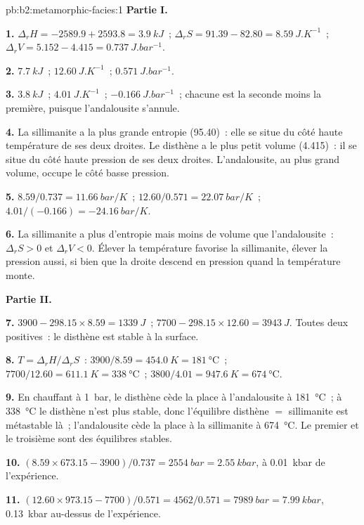 \begin{solution}{pb:b2:metamorphic-facies:1}
\noindent\textbf{Partie I.}

\textbf{1.} $\Delta_r H = -2589.9 + 2593.8 = \qty{3.9}{kJ}$~; $\Delta_r S = 91.39 - 82.80 =
\qty{8.59}{J.K^{-1}}$~; $\Delta_r V = 5.152 - 4.415 = \qty{0.737}{J.bar^{-1}}$.

\textbf{2.} $\qty{7.7}{kJ}$~; $\qty{12.60}{J.K^{-1}}$~; $\qty{0.571}{J.bar^{-1}}$.

\textbf{3.} $\qty{3.8}{kJ}$~; $\qty{4.01}{J.K^{-1}}$~; $\qty{-0.166}{J.bar^{-1}}$~; chacune est
la seconde moins la première, puisque l'andalousite s'annule.

\textbf{4.} La sillimanite a la plus grande entropie (95.40)~: elle se situe du côté haute température
de ses deux droites. Le disthène a le plus petit volume (4.415)~: il se situe du côté haute
pression de ses deux droites. L'andalousite, au plus grand volume, occupe le côté
basse pression.

\textbf{5.} $8.59/0.737 = \qty{11.66}{bar/K}$~; $12.60/0.571 = \qty{22.07}{bar/K}$~;
$4.01/(-0.166) = \qty{-24.16}{bar/K}$.

\textbf{6.} La sillimanite a plus d'entropie mais moins de volume que l'andalousite~: $\Delta_r S > 0$
et $\Delta_r V < 0$. Élever la température favorise la sillimanite, élever la pression aussi,
si bien que la droite descend en pression quand la température monte.

\noindent\textbf{Partie II.}

\textbf{7.} $3900 - 298.15\times8.59 = \qty{+1339}{J}$~; $7700 - 298.15\times12.60 =
\qty{+3943}{J}$. Toutes deux positives~: le disthène est stable à la surface.

\textbf{8.} $T = \Delta_r H/\Delta_r S$~: $3900/8.59 = \qty{454.0}{K} = \qty{181}{\celsius}$~;
$7700/12.60 = \qty{611.1}{K} = \qty{338}{\celsius}$~; $3800/4.01 = \qty{947.6}{K} =
\qty{674}{\celsius}$.

\textbf{9.} En chauffant à \qty{1}{bar}, le disthène cède la place à l'andalousite à
\qty{181}{\celsius}~; à \qty{338}{\celsius} le disthène n'est plus stable, donc l'équilibre disthène $=$
sillimanite est métastable là~; l'andalousite cède la place à la sillimanite à
\qty{674}{\celsius}. Le premier et le troisième sont des équilibres stables.

\textbf{10.} $(8.59\times673.15 - 3900)/0.737 = \qty{2554}{bar} = \qty{2.55}{kbar}$,
à \qty{0.01}{kbar} de l'expérience.

\textbf{11.} $(12.60\times973.15 - 7700)/0.571 = 4562/0.571 = \qty{7989}{bar} =
\qty{7.99}{kbar}$, \qty{0.13}{kbar} au-dessus de l'expérience.


\end{solution}
